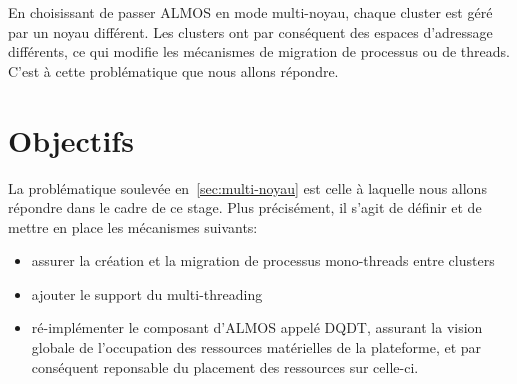     En choisissant de passer ALMOS en mode multi-noyau, chaque cluster est géré
    par un noyau différent. Les clusters ont par conséquent des espaces
    d'adressage différents, ce qui modifie les mécanismes de migration de
    processus ou de threads. C'est à cette problématique que nous allons
    répondre.


  \section{Objectifs}

    La problématique soulevée en~\ref{sec:multi-noyau} est celle à laquelle nous
    allons répondre dans le cadre de ce stage. Plus précisément, il s'agit de
    définir et de mettre en place les mécanismes suivants:

    \begin{itemize}
      \item assurer la création et la migration de processus mono-threads entre
        clusters
      \item ajouter le support du multi-threading
      \item ré-implémenter le composant d'ALMOS appelé
        DQDT, assurant
        la vision globale de l'occupation des ressources matérielles de la
        plateforme, et par conséquent reponsable du placement des ressources sur
        celle-ci.
    \end{itemize}

